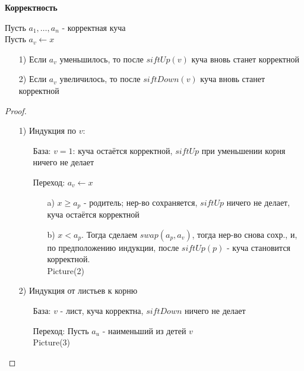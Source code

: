 \textbf{Корректность}
\begin{lemma}
Пусть $a_1, \ldots, a_n$ - корректная куча \\
Пусть $a_v \leftarrow x$
\begin{itemize}
  \item [1) ] Если $a_v$ уменьшилось, то после $siftUp(v)$ куча вновь станет корректной
  \item [2) ] Если $a_v$ увеличилось, то после $siftDown(v)$ куча вновь станет корректной
\end{itemize}
\end{lemma}
\begin{proof}
\begin{itemize}
  \item [1) ] Индукция по $v$:
    \begin{itemize}
      \item [База:] $v = 1$: куча остаётся корректной, $siftUp$ при уменьшении корня ничего не делает
      \item [Переход: ] $a_v \leftarrow x$
        \begin{itemize}
          \item [a) ] $x \geq a_p$ - родитель; нер-во сохраняется, $siftUp$ ничего не делает, куча остаётся корректной
          \item [b) ] $x < a_p$. Тогда сделаем $swap(a_p, a_v)$, тогда нер-во снова сохр., и, по предположению индукции, после $siftUp(p)$ - куча становится корректной. \\
            Picture(2)
        \end{itemize}
    \end{itemize}
  \item [2) ] Индукция от листьев к корню
    \begin{itemize}
      \item [База:] $v$ - лист, куча корректна, $siftDown$ ничего не делает 
      \item [Переход:] Пусть $a_u$ - наименьший из детей $v$ \\
        Picture(3)
    \end{itemize}
\end{itemize}
\end{proof}
